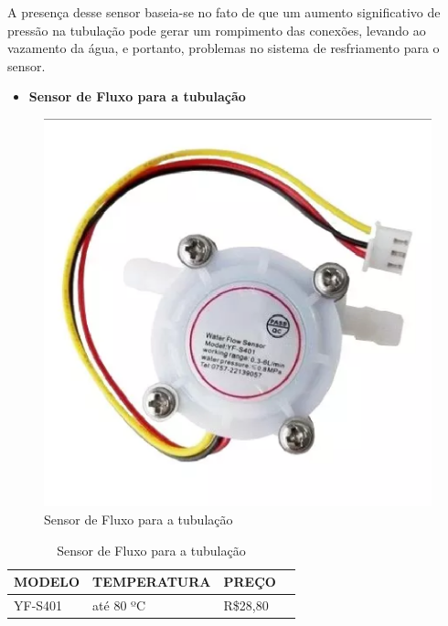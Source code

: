 A presença desse sensor baseia-se no fato de que um aumento significativo de pressão na tubulação pode gerar um rompimento das conexões, levando ao vazamento da água, e portanto, problemas no sistema de  resfriamento para o sensor.

\begin{itemize}
    \item \textbf{Sensor de Fluxo para a tubulação}
\end{itemize}
\begin{figure}[!htb]                  
	\centering                          
	\includegraphics[scale=0.5]{figuras/Figura6.eps}
	\caption{ Sensor de Fluxo para a tubulação}   \label{figsensor4}          
\end{figure}

\begin{table}[!h]
    \centering
    \begin{tabular}{|p{3cm}|p{5cm}|p{3cm}|p{3cm}|}
    \hline
    \textbf{MODELO} & \textbf{TEMPERATURA}    & \textbf{PREÇO} \\ \hline
    YF-S401      & até 80 ºC &  R\$28,80  \\ \hline
    \end{tabular}
    \caption{Sensor de Fluxo para a tubulação}
    \end{table}

